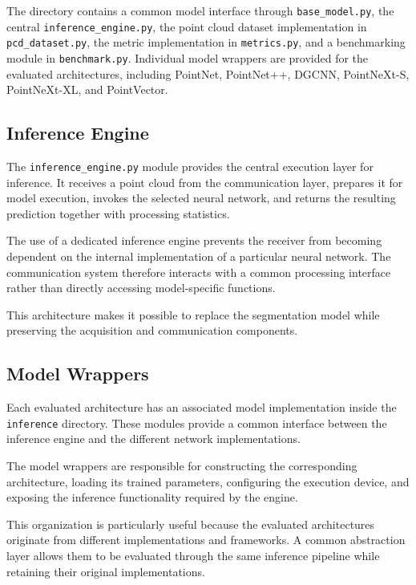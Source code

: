 The directory contains a common model interface through \texttt{base\_model.py}, the central \texttt{inference\_engine.py}, the point cloud dataset implementation in \texttt{pcd\_dataset.py}, the metric implementation in \texttt{metrics.py}, and a benchmarking module in \texttt{benchmark.py}. Individual model wrappers are provided for the evaluated architectures, including PointNet, PointNet++, DGCNN, PointNeXt-S, PointNeXt-XL, and PointVector.

\subsection{Inference Engine}

The \texttt{inference\_engine.py} module provides the central execution layer for inference. It receives a point cloud from the communication layer, prepares it for model execution, invokes the selected neural network, and returns the resulting prediction together with processing statistics.

The use of a dedicated inference engine prevents the receiver from becoming dependent on the internal implementation of a particular neural network. The communication system therefore interacts with a common processing interface rather than directly accessing model-specific functions.

This architecture makes it possible to replace the segmentation model while preserving the acquisition and communication components.

\subsection{Model Wrappers}

Each evaluated architecture has an associated model implementation inside the \texttt{inference} directory. These modules provide a common interface between the inference engine and the different network implementations.

The model wrappers are responsible for constructing the corresponding architecture, loading its trained parameters, configuring the execution device, and exposing the inference functionality required by the engine.

This organization is particularly useful because the evaluated architectures originate from different implementations and frameworks. A common abstraction layer allows them to be evaluated through the same inference pipeline while retaining their original implementations.

